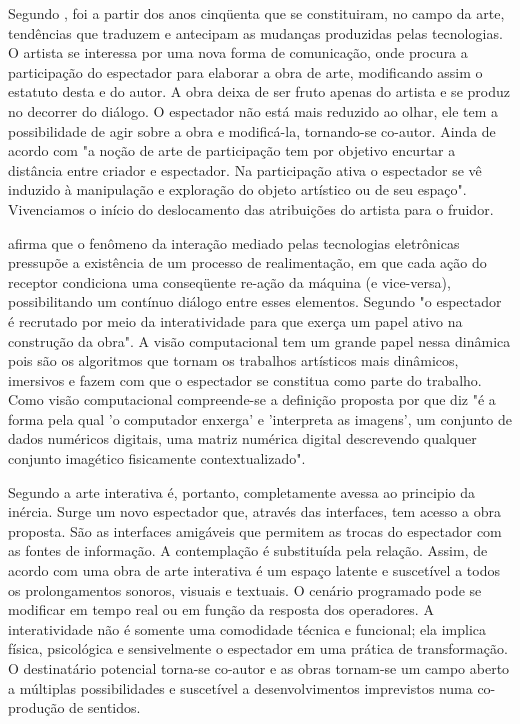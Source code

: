 Segundo , foi a partir dos anos cinqüenta que se constituiram, no campo da arte, tendências que traduzem e antecipam as mudanças produzidas pelas tecnologias. O artista se interessa por uma nova forma de comunicação, onde procura a participação do espectador para elaborar a obra de arte, modificando assim o estatuto desta e do autor. A obra deixa de ser fruto apenas do artista e se produz no decorrer do diálogo. O espectador não está mais reduzido ao olhar, ele tem a possibilidade de agir sobre a obra e modificá-la, tornando-se co-autor. Ainda de acordo com  "a noção de arte de participação tem por objetivo encurtar a distância entre criador e espectador. Na participação ativa o espectador se vê induzido à manipulação e exploração do objeto artístico ou de seu espaço". Vivenciamos o início do deslocamento das atribuições do artista para o fruidor. 

 afirma que o fenômeno da interação mediado pelas tecnologias eletrônicas pressupõe a existência de um processo de realimentação, em que cada ação do receptor condiciona uma conseqüente re-ação da máquina (e vice-versa), possibilitando um contínuo diálogo entre esses elementos. Segundo  "o espectador é recrutado por meio da interatividade para que exerça um papel ativo na construção da obra". A visão computacional tem um grande papel nessa dinâmica pois são os algoritmos que tornam os trabalhos artísticos mais dinâmicos, imersivos e fazem com que o espectador se constitua como parte do trabalho. Como visão computacional compreende-se a definição proposta por  que diz "é a forma pela qual 'o computador enxerga' e 'interpreta as imagens', um conjunto de dados numéricos digitais, uma matriz numérica digital descrevendo qualquer conjunto imagético fisicamente contextualizado".

Segundo  a arte interativa é, portanto, completamente avessa ao principio da inércia. Surge um novo espectador que, através das interfaces, tem acesso a obra proposta. São as interfaces amigáveis que permitem as trocas do espectador com as fontes de informação. A contemplação é substituída pela relação. Assim, de acordo com  uma obra de arte interativa é um espaço latente e suscetível a todos os prolongamentos sonoros, visuais e textuais. O cenário programado pode se modificar em tempo real ou em função da resposta dos operadores. A interatividade não é somente uma comodidade técnica e funcional; ela implica física, psicológica e sensivelmente o espectador em uma prática de transformação. O destinatário potencial torna-se co-autor e as obras tornam-se um campo aberto a múltiplas possibilidades e suscetível a desenvolvimentos imprevistos numa co-produção de sentidos.	

